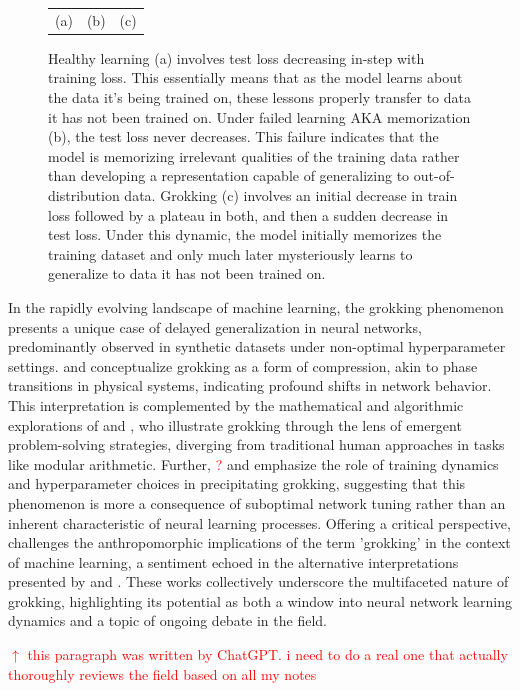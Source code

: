 \documentclass{article}
\begin{document}
\begin{figure}[t]
\begin{tabular}{ccc}
        (a) & (b) & (c) \\
    \end{tabular}
    \caption{Healthy learning (a) involves test loss decreasing in-step with training loss. 
    This essentially means that as the model learns about the data it's being trained on, these lessons properly transfer to data it has not been trained on. 
    Under failed learning AKA memorization (b), the test loss never decreases. 
    This failure indicates that the model is memorizing irrelevant qualities of the training data rather than developing a representation capable of generalizing to out-of-distribution data. 
    Grokking (c) involves an initial decrease in train loss followed by a plateau in both, and then a sudden decrease in test loss. 
    Under this dynamic, the model initially memorizes the training dataset and only much later mysteriously learns to generalize to data it has not been trained on.}
    \label{fig:grok}
\end{figure}

In the rapidly evolving landscape of machine learning, the grokking phenomenon presents a unique case of delayed generalization in neural networks, predominantly observed in synthetic datasets under non-optimal hyperparameter settings. 
\textcolor{red}{\cite{liu2023grokking}} and \textcolor{red}{\cite{merrill2023tale}} conceptualize grokking as a form of compression, akin to phase transitions in physical systems, indicating profound shifts in network behavior. 
This interpretation is complemented by the mathematical and algorithmic explorations of \textcolor{red}{\cite{nanda2023progress}} and \textcolor{red}{\cite{rubin2023droplets}}, who illustrate grokking through the lens of emergent problem-solving strategies, diverging from traditional human approaches in tasks like modular arithmetic. 
Further, \textcolor{red}{\cite{liu2022omnigrok, liu2022towards}?} and \textcolor{red}{\cite{kumar2023grokking}} emphasize the role of training dynamics and hyperparameter choices in precipitating grokking, suggesting that this phenomenon is more a consequence of suboptimal network tuning rather than an inherent characteristic of neural learning processes. 
Offering a critical perspective, \cite{pope2023grok} challenges the anthropomorphic implications of the term 'grokking' in the context of machine learning, a sentiment echoed in the alternative interpretations presented by \textcolor{red}{\cite{davies2023unifying}} and \textcolor{red}{\cite{barak2022hidden}}. 
These works collectively underscore the multifaceted nature of grokking, highlighting its potential as both a window into neural network learning dynamics and a topic of ongoing debate in the field.\par
\textcolor{red}{$\uparrow$ this paragraph was written by ChatGPT. i need to do a real one that actually thoroughly reviews the field based on all my notes}
\end{document}
